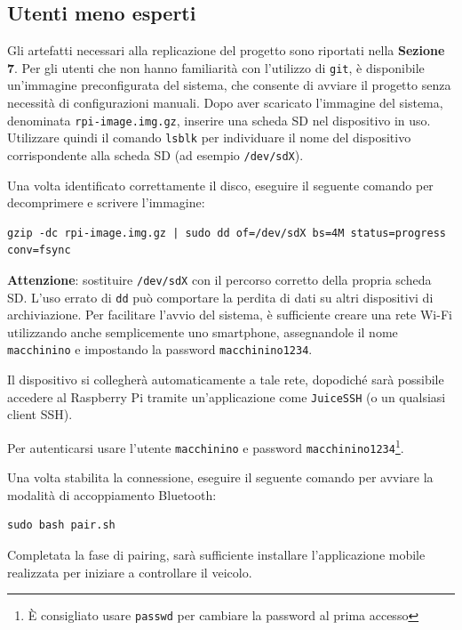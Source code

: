 \documentclass{article}
\begin{document}
\subsection{Utenti meno esperti}
Gli artefatti necessari alla replicazione del progetto sono riportati nella \textbf{Sezione 7}. Per gli utenti che non hanno familiarità con l’utilizzo di \texttt{git}, è disponibile un’immagine preconfigurata del sistema, che consente di avviare il progetto senza necessità di configurazioni manuali.
\newline
Dopo aver scaricato l’immagine del sistema, denominata \texttt{rpi-image.img.gz}, inserire una scheda SD nel dispositivo in uso. Utilizzare quindi il comando \texttt{lsblk} per individuare il nome del dispositivo corrispondente alla scheda SD (ad esempio \texttt{/dev/sdX}).

Una volta identificato correttamente il disco, eseguire il seguente comando per decomprimere e scrivere l’immagine:

\begin{verbatim}
gzip -dc rpi-image.img.gz | sudo dd of=/dev/sdX bs=4M status=progress conv=fsync
\end{verbatim}

\textbf{Attenzione}: sostituire \texttt{/dev/sdX} con il percorso corretto della propria scheda SD. L'uso errato di \texttt{dd} può comportare la perdita di dati su altri dispositivi di archiviazione.
\newline
Per facilitare l'avvio del sistema, è sufficiente creare una rete Wi-Fi utilizzando anche semplicemente uno smartphone, assegnandole il nome \texttt{macchinino} e impostando la password \texttt{macchinino1234}.

Il dispositivo si collegherà automaticamente a tale rete, dopodiché sarà possibile accedere al Raspberry Pi tramite un'applicazione come \texttt{JuiceSSH} (o un qualsiasi client SSH).

Per autenticarsi usare l'utente \texttt{macchinino} e password \texttt{macchinino1234}\footnote{\`E consigliato usare \texttt{passwd} per cambiare la password al prima accesso}.

Una volta stabilita la connessione, eseguire il seguente comando per avviare la modalità di accoppiamento Bluetooth:

\begin{verbatim}
sudo bash pair.sh
\end{verbatim}

Completata la fase di pairing, sarà sufficiente installare l’applicazione mobile realizzata per iniziare a controllare il veicolo.
\end{document}
